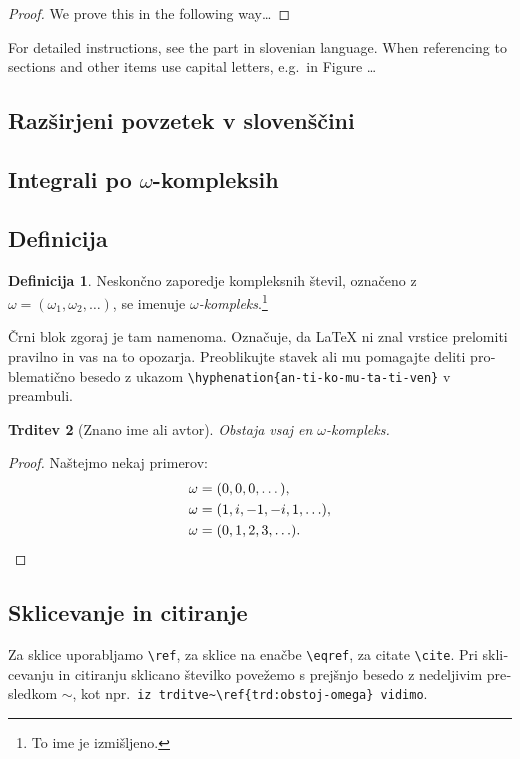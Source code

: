 \documentclass[12pt,a4paper,twoside]{article}
\theoremstyle{definition} %
\newtheorem{definicija}{Definicija}[section]
\theoremstyle{plain} %
\newtheorem{trditev}[definicija]{Trditev}
\numberwithin{equation}{section}  %
\begin{document}
\begin{proof}
We prove this in the following way\dots
\end{proof}

For detailed instructions, see the part in slovenian language. When referencing to sections and
other items use capital letters, e.g.\ in Figure \dots

\cleardoublepage
\begin{otherlanguage}{slovene}
\section{Razširjeni povzetek v slovenščini}

\subsection{Integrali po \texorpdfstring{$\omega$}{ω}-kompleksih}
\subsection{Definicija}
\begin{definicija}
  Neskončno zaporedje kompleksnih števil, označeno z $\omega = (\omega_1, \omega_2, \ldots)$,
  se imenuje \emph{$\omega$-kompleks}.\footnote{To ime je izmišljeno.}

  Črni blok zgoraj je tam namenoma. Označuje, da \LaTeX{} ni znal vrstice prelomiti pravilno
  in vas na to opozarja. Preoblikujte stavek ali mu pomagajte deliti problematično besedo z
  ukazom \verb|\hyphenation{an-ti-ko-mu-ta-ti-ven}| v preambuli.
\end{definicija}
\begin{trditev}[Znano ime ali avtor]
  \label{trd:obstoj-omega}
  Obstaja vsaj en $\omega$-kompleks.
\end{trditev}
\begin{proof}
  Naštejmo nekaj primerov:
  \begin{align}
    \omega &= (0, 0, 0, \dots), \label{eq:zero-kompleks} \\
    \omega &= (1, i, -1, -i, 1, \ldots),  \\
    \omega &= (0, 1, 2, 3, \ldots). \qedhere  %
  \end{align}
\end{proof}
\subsection{Sklicevanje in citiranje}
Za sklice uporabljamo \verb|\ref|, za sklice na enačbe \verb|\eqref|, za citate \verb|\cite|. Pri
sklicevanju in citiranju sklicano številko povežemo s prejšnjo besedo z nedeljivim presledkom
$\sim$, kot npr.\ \verb|iz trditve~\ref{trd:obstoj-omega} vidimo|.


\end{otherlanguage}
\end{document}
